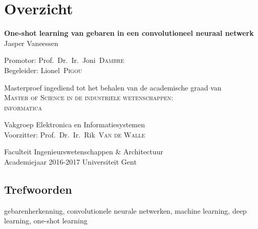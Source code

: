 
\newpage
{
\setlength{\baselineskip}{12pt}
\setlength{\parindent}{0pt}
\setlength{\parskip}{6pt}

\chapter{Overzicht}
\begin{center}

\vspace{5mm}
\renewcommand{\baselinestretch}{1.1}
\noindent \textbf{
One-shot learning van gebaren in een convolutioneel neuraal netwerk
} \\
\renewcommand{\baselinestretch}{1.3}
\normalsize
Jasper Vaneessen
\vspace{5mm}
\end{center}

Promotor: Prof.~Dr.~Ir.~Joni~\textsc{Dambre}\\
Begeleider: Lionel~\textsc{Pigou}

\vspace{5mm}

Masterproef ingediend tot het behalen van de academische graad van\\
\textsc{Master of Science in de industri\"ele wetenschappen:\\ informatica}

\vspace{5mm}

Vakgroep Elektronica en Informatiesystemen\\
Voorzitter: Prof.~Dr.~Ir.~Rik~\textsc{Van de Walle}

\vspace{5mm}

Faculteit Ingenieurswetenschappen \& Architectuur\\
Academiejaar 2016-2017
Universiteit Gent





\section*{Trefwoorden}
gebarenherkenning, convolutionele neurale netwerken, machine learning, deep learning, one-shot learning
}

\newpage %
